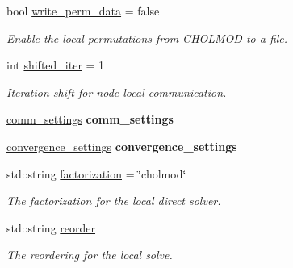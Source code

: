\begin{DoxyCompactItemize}
bool \hyperlink{structschwz_1_1Settings_af692ca8550d16b538dcfddb5208e73f3}{write\+\_\+perm\+\_\+data} = false
\begin{DoxyCompactList}\small\item\em Enable the local permutations from C\+H\+O\+L\+M\+OD to a file. \end{DoxyCompactList}\item 
\mbox{\label{structschwz_1_1Settings_a33a9382f1b5961a8cb2133cb0c22daf0}} 
int \hyperlink{structschwz_1_1Settings_a33a9382f1b5961a8cb2133cb0c22daf0}{shifted\+\_\+iter} = 1
\begin{DoxyCompactList}\small\item\em Iteration shift for node local communication. \end{DoxyCompactList}\item 
\mbox{\label{structschwz_1_1Settings_a063efd688bb2442d72165d1cbb230fc6}} 
\hyperlink{structschwz_1_1Settings_1_1comm__settings}{comm\+\_\+settings} {\bfseries comm\+\_\+settings}
\item 
\mbox{\label{structschwz_1_1Settings_aba00c697bd92d6ed6332eaaf047c69a0}} 
\hyperlink{structschwz_1_1Settings_1_1convergence__settings}{convergence\+\_\+settings} {\bfseries convergence\+\_\+settings}
\item 
\mbox{\label{structschwz_1_1Settings_a9ac5443eff787613f4f39843cbfa568d}} 
std\+::string \hyperlink{structschwz_1_1Settings_a9ac5443eff787613f4f39843cbfa568d}{factorization} = \char`\"{}cholmod\char`\"{}
\begin{DoxyCompactList}\small\item\em The factorization for the local direct solver. \end{DoxyCompactList}\item 
\mbox{\label{structschwz_1_1Settings_a429197e8093f3f87664ee6c37f91068e}} 
std\+::string \hyperlink{structschwz_1_1Settings_a429197e8093f3f87664ee6c37f91068e}{reorder}
\begin{DoxyCompactList}\small\item\em The reordering for the local solve. \end{DoxyCompactList}\end{DoxyCompactItemize}



